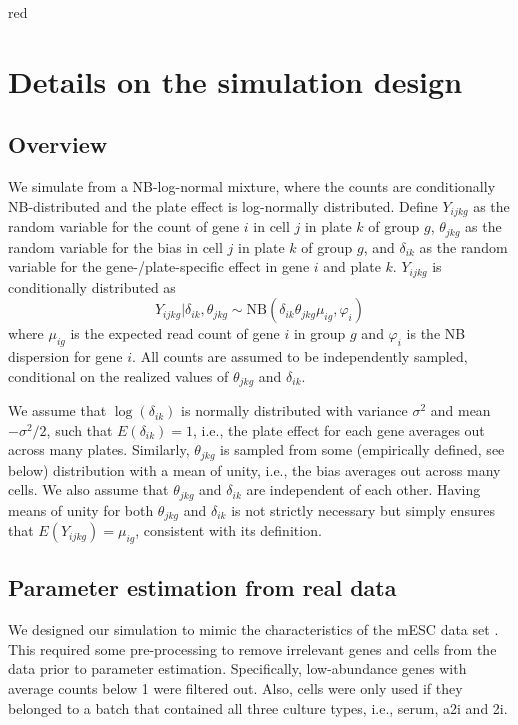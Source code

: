 \documentclass{article}
\begin{document}
\begin{color}{red}
\section{Details on the simulation design}

\subsection{Overview}
We simulate from a NB-log-normal mixture, where the counts are conditionally NB-distributed and the plate effect is log-normally distributed.
Define $Y_{ijkg}$ as the random variable for the count of gene $i$ in cell $j$ in plate $k$ of group $g$, 
    $\theta_{jkg}$ as the random variable for the bias in cell $j$ in plate $k$ of group $g$,
    and $\delta_{ik}$ as the random variable for the gene-/plate-specific effect in gene $i$ and plate $k$.
$Y_{ijkg}$ is conditionally distributed as
\[
    Y_{ijkg} | \delta_{ik}, \theta_{jkg} \sim \mbox{NB}(\delta_{ik}\theta_{jkg}\mu_{ig}, \varphi_i)
\]
where $\mu_{ig}$ is the expected read count of gene $i$ in group $g$ and $\varphi_i$ is the NB dispersion for gene $i$.
All counts are assumed to be independently sampled, conditional on the realized values of $\theta_{jkg}$ and $\delta_{ik}$.

We assume that $\log(\delta_{ik})$ is normally distributed with variance $\sigma^2$ and mean $-\sigma^2/2$, such that $E(\delta_{ik}) = 1$, i.e., the plate effect for each gene averages out across many plates.
Similarly, $\theta_{jkg}$ is sampled from some (empirically defined, see below) distribution with a mean of unity, i.e., the bias averages out across many cells.
We also assume that $\theta_{jkg}$ and $\delta_{ik}$ are independent of each other.
Having means of unity for both $\theta_{jkg}$ and $\delta_{ik}$ is not strictly necessary but simply ensures that $E(Y_{ijkg})=\mu_{ig}$, consistent with its definition.

\subsection{Parameter estimation from real data}
We designed our simulation to mimic the characteristics of the mESC data set \citep{kolod2015single}.
This required some pre-processing to remove irrelevant genes and cells from the data prior to parameter estimation.
Specifically, low-abundance genes with average counts below 1 were filtered out.
Also, cells were only used if they belonged to a batch that contained all three culture types, i.e., serum, a2i and 2i.


\end{color}
\end{document}
